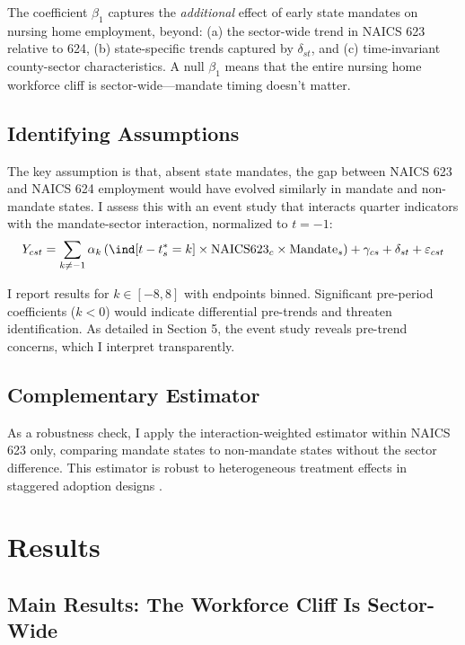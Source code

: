 \documentclass[12pt]{article}
\begin{document}
The coefficient $\beta_1$ captures the \emph{additional} effect of early state mandates on nursing home employment, beyond: (a) the sector-wide trend in NAICS 623 relative to 624, (b) state-specific trends captured by $\delta_{st}$, and (c) time-invariant county-sector characteristics. A null $\beta_1$ means that the entire nursing home workforce cliff is sector-wide---mandate timing doesn't matter.

\subsection{Identifying Assumptions}

The key assumption is that, absent state mandates, the gap between NAICS 623 and NAICS 624 employment would have evolved similarly in mandate and non-mandate states. I assess this with an event study that interacts quarter indicators with the mandate-sector interaction, normalized to $t = -1$:
\begin{equation}
Y_{cst} = \sum_{k \neq -1} \alpha_k \left(\ind[t - t^*_s = k] \times \text{NAICS623}_c \times \text{Mandate}_s\right) + \gamma_{cs} + \delta_{st} + \varepsilon_{cst}
\end{equation}

I report results for $k \in [-8, 8]$ with endpoints binned. Significant pre-period coefficients ($k < 0$) would indicate differential pre-trends and threaten identification. As detailed in Section 5, the event study reveals pre-trend concerns, which I interpret transparently.

\subsection{Complementary Estimator}

As a robustness check, I apply the \citet{sun2021estimating} interaction-weighted estimator within NAICS 623 only, comparing mandate states to non-mandate states without the sector difference. This estimator is robust to heterogeneous treatment effects in staggered adoption designs \citep{goodmanbacon2021difference}.

\section{Results}

\subsection{Main Results: The Workforce Cliff Is Sector-Wide}
\end{document}
